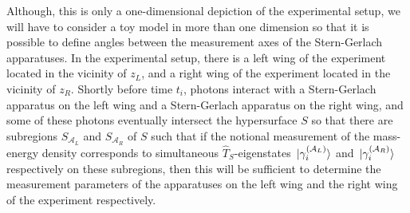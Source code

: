 Although, this is only a one-dimensional depiction of the experimental setup, we will have to consider a toy model in more than one dimension so that it is possible to define angles between the measurement axes of the Stern-Gerlach apparatuses. In the experimental setup, there is a left wing of the experiment located in the vicinity of $z_L$, and a right wing of the experiment located in the vicinity of $z_R$. Shortly before time $t_i$, photons interact with a Stern-Gerlach apparatus on the left wing and a Stern-Gerlach apparatus on the right wing, and some of these photons eventually intersect the hypersurface $S$ so that there are subregions $S_{\mathcal{A}_L}$ and $S_{\mathcal{A}_R}$ %
%
 of $S$ such that if the notional measurement of the mass-energy density corresponds to simultaneous $\hat{T}_S$-eigenstates $\ket*{\gamma_i^{(\mathcal{A}_L)}}$ and $\ket*{\gamma_i^{(\mathcal{A}_R)}}$ %
  respectively on these subregions, then this will be sufficient to determine the measurement parameters of the apparatuses on the left wing and the right wing of the experiment respectively. 

